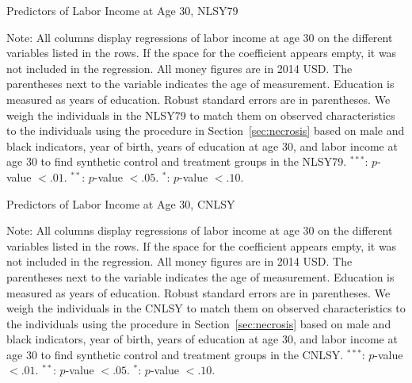 \begin{table}
\begin{threeparttable}
\caption{Predictors of Labor Income at Age 30, NLSY79}
\label{table:prednlsy}
\centering
\footnotesize

\begin{tablenotes}
\footnotesize
\item Note: All columns display regressions of labor income at age 30 on the different variables listed in the rows. If the space for the coefficient appears empty, it was not included in the regression. All money figures are in 2014 USD. The parentheses next to the variable indicates the age of measurement. Education is measured as years of education. Robust standard errors are in parentheses. We weigh the individuals in the NLSY79 to match them on observed characteristics to the individuals using the procedure in Section~\ref{sec:necrosis} based on male and black indicators, year of birth, years of education at age 30, and labor income at age 30 to find synthetic control and treatment groups in the NLSY79. $^{***}$: $p$-value $< .01$. $^{**}$: $p$-value $< .05$. $^{*}$: $p$-value $< .10$.
\end{tablenotes}
\end{threeparttable}
\end{table}

\begin{table}
\begin{threeparttable}
\caption{Predictors of Labor Income at Age 30, CNLSY}
\label{table:predcnlsy}
\centering
\footnotesize

\begin{tablenotes}
\footnotesize
\item  Note: All columns display regressions of labor income at age 30 on the different variables listed in the rows. If the space for the coefficient appears empty, it was not included in the regression. All money figures are in 2014 USD. The parentheses next to the variable indicates the age of measurement. Education is measured as years of education. Robust standard errors are in parentheses. We weigh the individuals in the CNLSY to match them on observed characteristics to the individuals using the procedure in Section~\ref{sec:necrosis} based on male and black indicators, year of birth, years of education at age 30, and labor income at age 30 to find synthetic control and treatment groups in the CNLSY. $^{***}$: $p$-value $< .01$. $^{**}$: $p$-value $< .05$. $^{*}$: $p$-value $< .10$.
\end{tablenotes}
\end{threeparttable}
\end{table}

